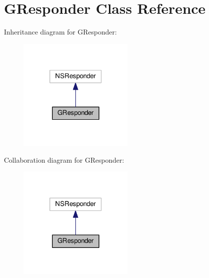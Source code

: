 \hypertarget{interfaceGResponder}{}\section{G\+Responder Class Reference}
\label{interfaceGResponder}


Inheritance diagram for G\+Responder\+:\nopagebreak
\begin{figure}[H]
\begin{center}
\leavevmode
\includegraphics[width=158pt]{interfaceGResponder__inherit__graph}
\end{center}
\end{figure}


Collaboration diagram for G\+Responder\+:\nopagebreak
\begin{figure}[H]
\begin{center}
\leavevmode
\includegraphics[width=158pt]{interfaceGResponder__coll__graph}
\end{center}
\end{figure}
